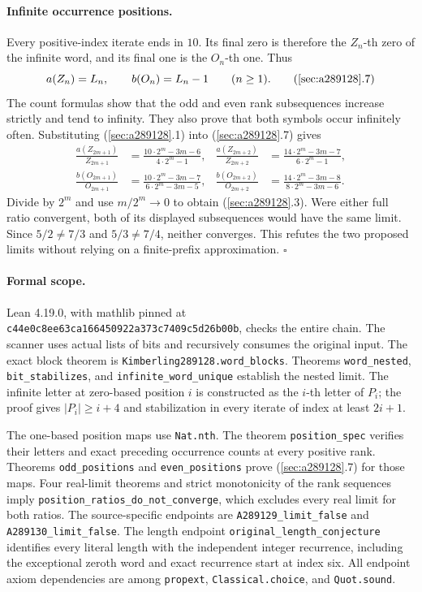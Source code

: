 \paragraph{Infinite occurrence positions.}
Every positive-index iterate ends in $10$. Its final zero is
therefore the $Z_n$-th zero of the infinite word, and its final one
is the $O_n$-th one. Thus
\[
a(Z_n)=L_n,\qquad b(O_n)=L_n-1\qquad(n\ge1).
\tag{\ref{sec:a289128}.7}
\]
The count formulas show that the odd and even rank subsequences
increase strictly and tend to infinity. They also prove that both
symbols occur infinitely often. Substituting
(\ref{sec:a289128}.1) into (\ref{sec:a289128}.7) gives
\[
\begin{aligned}
\frac{a(Z_{2m+1})}{Z_{2m+1}}
 &=\frac{10\cdot2^m-3m-6}{4\cdot2^m-1},&
\frac{a(Z_{2m+2})}{Z_{2m+2}}
 &=\frac{14\cdot2^m-3m-7}{6\cdot2^m-1},\\
\frac{b(O_{2m+1})}{O_{2m+1}}
 &=\frac{10\cdot2^m-3m-7}{6\cdot2^m-3m-5},&
\frac{b(O_{2m+2})}{O_{2m+2}}
 &=\frac{14\cdot2^m-3m-8}{8\cdot2^m-3m-6}.
\end{aligned}
\]
Divide by $2^m$ and use $m/2^m\to0$ to obtain
(\ref{sec:a289128}.3). Were either full ratio convergent, both of
its displayed subsequences would have the same limit. Since
$5/2\ne7/3$ and $5/3\ne7/4$, neither converges. This refutes the
two proposed limits without relying on a finite-prefix
approximation. $\square$

\paragraph{Formal scope.}
Lean 4.19.0, with mathlib pinned at
\texttt{c44e0c8ee63ca166450922a373c7409c5d26b00b}, checks the entire
chain. The scanner uses actual lists of bits and recursively
consumes the original input. The exact block theorem is
\texttt{Kimberling289128.word\_blocks}. Theorems
\texttt{word\_nested}, \texttt{bit\_stabilizes}, and
\texttt{infinite\_word\_unique} establish the nested limit. The
infinite letter at zero-based position $i$ is constructed as the
$i$-th letter of $P_i$; the proof gives $|P_i|\ge i+4$ and
stabilization in every iterate of index at least $2i+1$.

The one-based position maps use \texttt{Nat.nth}. The theorem
\texttt{position\_spec} verifies their letters and exact preceding
occurrence counts at every positive rank. Theorems
\texttt{odd\_positions} and \texttt{even\_positions} prove
(\ref{sec:a289128}.7) for those maps. Four real-limit theorems and
strict monotonicity of the rank sequences imply
\texttt{position\_ratios\_do\_not\_converge}, which excludes every
real limit for both ratios. The source-specific endpoints are
\texttt{A289129\_limit\_false} and
\texttt{A289130\_limit\_false}. The length endpoint
\texttt{original\_length\_conjecture} identifies every literal
length with the independent integer recurrence, including the
exceptional zeroth word and exact recurrence start at index six.
All endpoint axiom dependencies are among
\texttt{propext}, \texttt{Classical.choice}, and \texttt{Quot.sound}.

